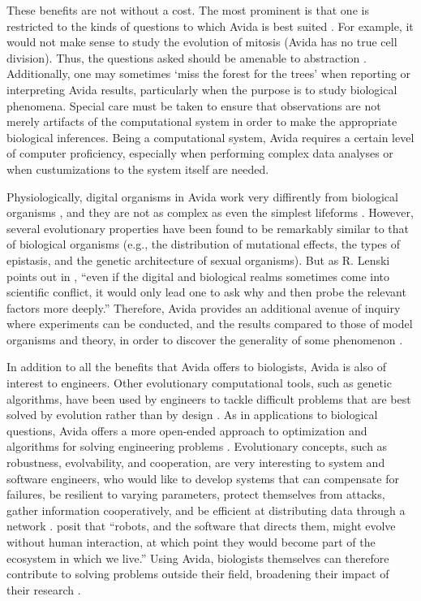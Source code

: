 \begin{doublespace}
These benefits are not without a cost.
%
The most prominent is that one is restricted to the kinds of questions
to which Avida is best suited \citep{wil02}.
%
For example, it would not make sense to study
the evolution of mitosis (Avida has no true cell division).
%
Thus, the questions asked should be amenable to abstraction \citep{wil02}.
%
Additionally, one may sometimes `miss the forest for the trees'
when reporting or interpreting Avida results,
particularly when the purpose is to study biological phenomena.
%
Special care must be taken to ensure that observations
are not merely artifacts of the computational system
in order to make the appropriate biological inferences.
%
Being a computational system, Avida requires a certain level
of computer proficiency, especially when performing complex data analyses
or when custumizations to the system itself are needed.



Physiologically, digital organisms in Avida work very diffirently
from biological organisms \citep{yed01},
and they are not as complex as even the simplest lifeforms \citep{len01}.
%
However, several evolutionary properties have been found
to be remarkably similar to that of biological organisms
\citep{yed01,wil02,ada06}
(e.g., the distribution of mutational effects, the types of epistasis,
and the genetic architecture of sexual organisms).
%
But as R. Lenski points out in \citet{one03},
``even if the digital and biological realms sometimes come
into scientific conflict, it would only lead one to ask why
and then probe the relevant factors more deeply.''
%
Therefore, Avida provides an additional avenue of inquiry
where experiments can be conducted, and the results compared
to those of model organisms and theory,
in order to discover the generality of some phenomenon \citep{wil02}.



In addition to all the benefits that Avida offers to biologists,
Avida is also of interest to engineers.
%
Other evolutionary computational tools, such as genetic algorithms,
have been used by engineers to tackle difficult problems
that are best solved by evolution rather than by design \citep{mck08}.
%
As in applications to biological questions,
Avida offers a more open-ended approach to optimization and
algorithms for solving engineering problems \citep{mck08}.
%
Evolutionary concepts, such as robustness, evolvability, and cooperation,
are very interesting to system and software engineers,
who would like to develop systems that can compensate for failures,
be resilient to varying parameters, protect themselves from attacks,
gather information cooperatively,
and be efficient at distributing data through a network
\citep{bec07,mck08,gol08,kno09,kno11}.
%
\citet{wil02} posit that ``robots, and the software that directs them,
might evolve without human interaction, at which point they would become
part of the ecosystem in which we live.''
%
Using Avida, biologists themselves can therefore contribute to solving problems
outside their field, broadening their impact of their research \citep{one03}.




\end{doublespace}
